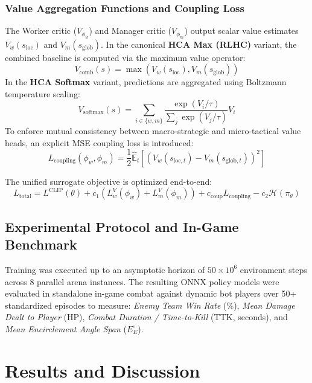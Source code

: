 \documentclass[conference]{IEEEtran}
\begin{document}
\subsubsection{Value Aggregation Functions and Coupling Loss}
The Worker critic (\(V_{\phi_w}\)) and Manager critic (\(V_{\phi_m}\)) output scalar value estimates \(V_w(s_{\text{loc}})\) and \(V_m(s_{\text{glob}})\). In the canonical \textbf{HCA Max (RLHC)} variant, the combined baseline is computed via the maximum value operator:
\begin{equation}
V_{\text{comb}}(s) = \max \left( V_w(s_{\text{loc}}), V_m(s_{\text{glob}}) \right)
\end{equation}
In the \textbf{HCA Softmax} variant, predictions are aggregated using Boltzmann temperature scaling:
\begin{equation}
V_{\text{softmax}}(s) = \sum_{i \in \{w, m\}} \frac{\exp(V_i / \tau)}{\sum_{j} \exp(V_j / \tau)} V_i
\end{equation}
To enforce mutual consistency between macro-strategic and micro-tactical value heads, an explicit MSE coupling loss is introduced:
\begin{equation}
L_{\text{coupling}}(\phi_w, \phi_m) = \frac{1}{2} \hat{\mathbb{E}}_t \left[ \left( V_w(s_{\text{loc}, t}) - V_m(s_{\text{glob}, t}) \right)^2 \right]
\end{equation}

The unified surrogate objective is optimized end-to-end:
\begin{equation}
L_{\text{total}} = L^{\text{CLIP}}(\theta) + c_1 \left( L^V_w(\phi_w) + L^V_m(\phi_m) \right) + c_{\text{coup}} L_{\text{coupling}} - c_2 \mathcal{H}(\pi_\theta)
\end{equation}

\subsection{Experimental Protocol and In-Game Benchmark}
Training was executed up to an asymptotic horizon of \(50 \times 10^6\) environment steps across 8 parallel arena instances. The resulting ONNX policy models were evaluated in standalone in-game combat against dynamic bot players over 50+ standardized episodes to measure: \textit{Enemy Team Win Rate} (\%), \textit{Mean Damage Dealt to Player} (HP), \textit{Combat Duration / Time-to-Kill} (TTK, seconds), and \textit{Mean Encirclement Angle Span} (\(E_E^\circ\)).

\section{Results and Discussion}
\end{document}
